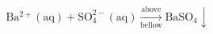 \[
\mathrm{Ba^{2+}(aq) + SO_4^{2-}(aq)
\underset{bellow}{\overset{above}{\longrightarrow}} BaSO_4\downarrow}
\]
